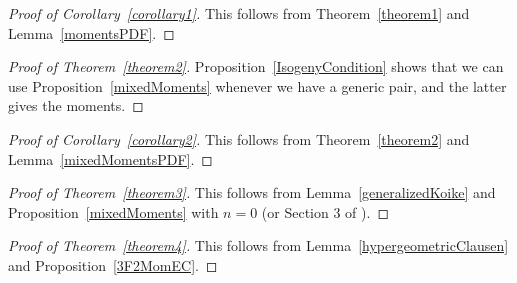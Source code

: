 \documentclass[12pt]{amsart}
\theoremstyle{definition}
\theoremstyle{remark}
\numberwithin{equation}{section}
\begin{document}
\begin{proof}[Proof of Corollary~\ref{corollary1}]
    This follows from Theorem~\ref{theorem1} and Lemma~\ref{momentsPDF}.
\end{proof}

\begin{proof}[Proof of Theorem~\ref{theorem2}]
    Proposition~\ref{IsogenyCondition} shows that we can use Proposition~\ref{mixedMoments} whenever we have a generic pair, and the latter gives the moments.
\end{proof}

\begin{proof}[Proof of Corollary~\ref{corollary2}]
    This follows from Theorem~\ref{theorem2} and Lemma~\ref{mixedMomentsPDF}.
\end{proof}

\begin{proof}[Proof of Theorem~\ref{theorem3}]
This follows from Lemma~\ref{generalizedKoike} and Proposition~\ref{mixedMoments} with $n=0$ (or Section 3 of \cite{RangMoyen}). 
\end{proof}

\begin{proof}[Proof of Theorem~\ref{theorem4}]
    This follows from Lemma~\ref{hypergeometricClausen} and Proposition~\ref{3F2MomEC}.
\end{proof}



\end{document}

